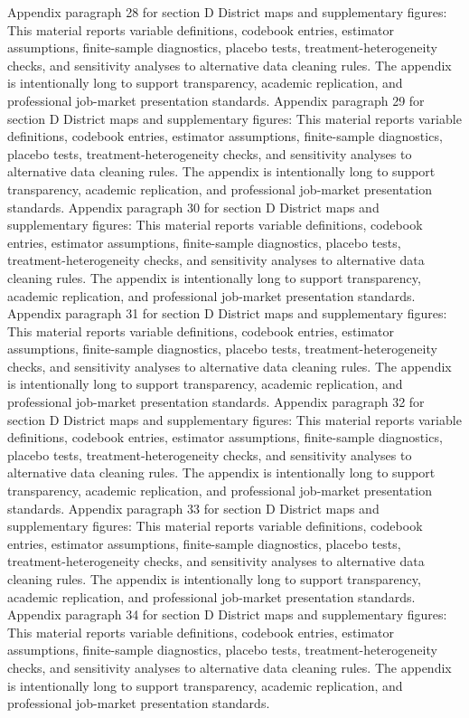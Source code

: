 \documentclass[preprint,12pt]{elsarticle}
\begin{document}
Appendix paragraph 28 for section D District maps and supplementary figures: This material reports variable definitions, codebook entries, estimator assumptions, finite-sample diagnostics, placebo tests, treatment-heterogeneity checks, and sensitivity analyses to alternative data cleaning rules. The appendix is intentionally long to support transparency, academic replication, and professional job-market presentation standards.
Appendix paragraph 29 for section D District maps and supplementary figures: This material reports variable definitions, codebook entries, estimator assumptions, finite-sample diagnostics, placebo tests, treatment-heterogeneity checks, and sensitivity analyses to alternative data cleaning rules. The appendix is intentionally long to support transparency, academic replication, and professional job-market presentation standards.
Appendix paragraph 30 for section D District maps and supplementary figures: This material reports variable definitions, codebook entries, estimator assumptions, finite-sample diagnostics, placebo tests, treatment-heterogeneity checks, and sensitivity analyses to alternative data cleaning rules. The appendix is intentionally long to support transparency, academic replication, and professional job-market presentation standards.
Appendix paragraph 31 for section D District maps and supplementary figures: This material reports variable definitions, codebook entries, estimator assumptions, finite-sample diagnostics, placebo tests, treatment-heterogeneity checks, and sensitivity analyses to alternative data cleaning rules. The appendix is intentionally long to support transparency, academic replication, and professional job-market presentation standards.
Appendix paragraph 32 for section D District maps and supplementary figures: This material reports variable definitions, codebook entries, estimator assumptions, finite-sample diagnostics, placebo tests, treatment-heterogeneity checks, and sensitivity analyses to alternative data cleaning rules. The appendix is intentionally long to support transparency, academic replication, and professional job-market presentation standards.
Appendix paragraph 33 for section D District maps and supplementary figures: This material reports variable definitions, codebook entries, estimator assumptions, finite-sample diagnostics, placebo tests, treatment-heterogeneity checks, and sensitivity analyses to alternative data cleaning rules. The appendix is intentionally long to support transparency, academic replication, and professional job-market presentation standards.
Appendix paragraph 34 for section D District maps and supplementary figures: This material reports variable definitions, codebook entries, estimator assumptions, finite-sample diagnostics, placebo tests, treatment-heterogeneity checks, and sensitivity analyses to alternative data cleaning rules. The appendix is intentionally long to support transparency, academic replication, and professional job-market presentation standards.
\end{document}
